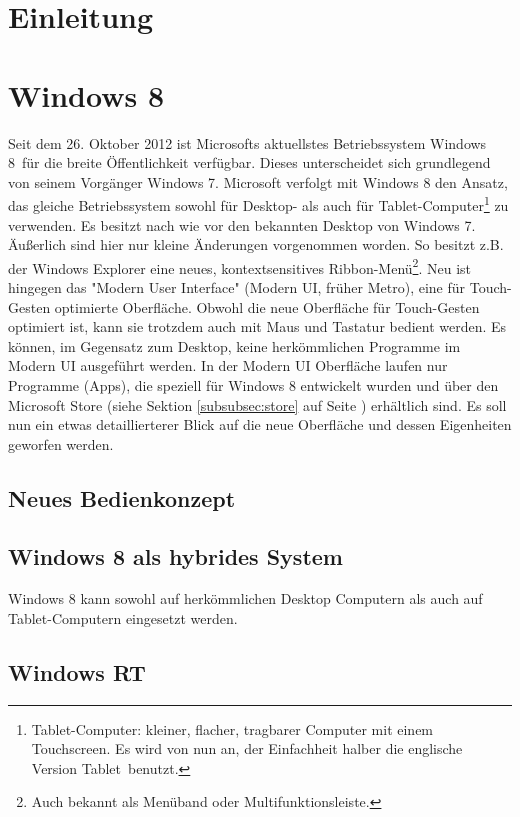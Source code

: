 \documentclass[12pt,a4paper]{scrartcl}
\author{Malte Modrow}
\begin{document}
\section{Einleitung}
\label{einleitung}
\newpage
\section{Windows 8}
\label{sec:windows8}
Seit dem 26. Oktober 2012 ist Microsofts aktuellstes Betriebssystem \glqq Windows 8\grqq\ für die breite Öffentlichkeit verfügbar. Dieses unterscheidet sich grundlegend von seinem Vorgänger \glqq Windows 7\grqq. Microsoft verfolgt mit Windows 8 den Ansatz, das gleiche Betriebssystem sowohl für Desktop- als auch für Tablet-Computer\footnote{Tablet-Computer: kleiner, flacher, tragbarer Computer mit einem Touchscreen. Es wird von nun an, der Einfachheit halber die englische Version \glqq Tablet\grqq\ benutzt.} zu verwenden. Es besitzt nach wie vor den bekannten Desktop von Windows 7. Äußerlich sind hier nur kleine Änderungen vorgenommen worden. So besitzt z.B. der Windows Explorer eine neues, kontextsensitives Ribbon-Menü\footnote{Auch bekannt als Menüband oder Multifunktionsleiste.}. Neu ist hingegen das "Modern User Interface" (Modern UI, früher Metro), eine für Touch-Gesten optimierte Oberfläche. Obwohl die neue Oberfläche für Touch-Gesten optimiert ist, kann sie trotzdem auch mit Maus und Tastatur bedient werden. Es können, im Gegensatz zum Desktop, keine herkömmlichen Programme im Modern UI ausgeführt werden. In der Modern UI Oberfläche laufen nur Programme (Apps), die speziell für Windows 8 entwickelt wurden und über den Microsoft Store (siehe Sektion \ref{subsubsec:store} auf Seite \pageref{subsubsec:store}) erhältlich sind. Es soll nun ein etwas detaillierterer Blick auf die neue Oberfläche und dessen Eigenheiten geworfen werden.
\subsection{Neues Bedienkonzept}
\label{subsec:bedienkonzept}

\subsection{Windows 8 als hybrides System}
\label{subsec:hybrides system}
Windows 8 kann sowohl auf herkömmlichen Desktop Computern als auch auf Tablet-Computern eingesetzt werden. 
\subsection{Windows RT}
\label{subsec:winRT}
\end{document}
